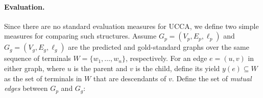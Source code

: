 \documentclass[11pt,a4paper]{article}
\begin{document}
\begin{table}
\caption{Hyperparameters used for the different classifiers.}
\label{table:hyperparameters}
\end{table}

\paragraph{Evaluation.}
Since there are no standard evaluation measures for UCCA, we define
two simple measures for comparing such structures.
Assume $G_p=(V_p,E_p,\ell_p)$ and $G_g=(V_g,E_g,\ell_g)$
are the predicted and gold-standard graphs over the same
sequence of terminals $W = \{w_1,\ldots,w_n\}$, respectively.
For an edge $e=(u,v)$ in either graph,
where $u$ is the parent and $v$ is the child, define its yield $y(e) \subseteq W$ as the
set of terminals in $W$ that are descendants of $v$.
Define the set of \textit{mutual edges} between $G_p$ and $G_g$:
\end{document}
